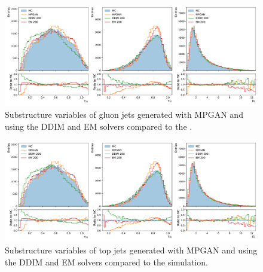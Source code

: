 \begin{figure}[hbpt]
    \centering
    \includegraphics[width=1.\textwidth]{Figures/jet_generation/jedi/gluon/jet_substructure_rel.pdf}
    \caption{Substructure variables of gluon jets generated with MPGAN and \pcjedi using the DDIM and EM solvers compared to the \pythia.}
    \label{fig:substructure_gluon}
\end{figure}

\begin{figure}[hbpt]
    \centering
    \includegraphics[width=1.\textwidth]{Figures/jet_generation/jedi/gluon/jet_substructure_rel.pdf}
    \caption{Substructure variables of top jets generated with MPGAN and \pcjedi using the DDIM and EM solvers compared to the \pythia simulation.}
    \label{fig:substructure_top}
\end{figure}

